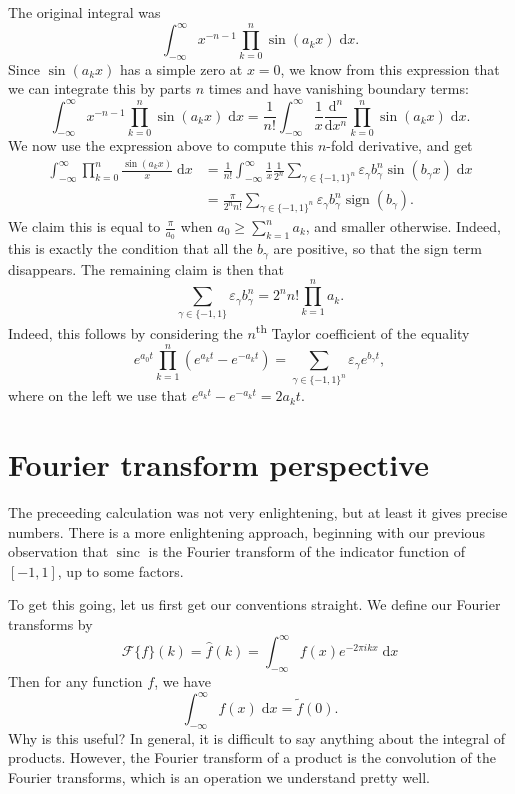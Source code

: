 \documentclass{shortart}
\theoremstyle{definition}
\DeclareMathOperator\sinc{sinc}
\DeclareMathOperator\sign{sign}
\renewcommand\d{\mathrm{d}}
\begin{document}
The original integral was
\[
  \int_{-\infty}^\infty x^{-n - 1} \prod_{k = 0}^n \sin(a_k x)\;\d x.
\]
Since $\sin(a_k x)$ has a simple zero at $x = 0$, we know from this expression that we can integrate this by parts $n$ times and have vanishing boundary terms:
\[
  \int_{-\infty}^\infty x^{-n - 1} \prod_{k = 0}^n \sin (a_k x)\;\d x = \frac{1}{n!} \int_{-\infty}^\infty \frac{1}{x} \frac{\d^n}{\d x^n} \prod_{k = 0}^n \sin (a_k x)\;\d x.
\]
We now use the expression above to compute this $n$-fold derivative, and get
\[
  \begin{aligned}
    \int_{-\infty}^\infty \prod_{k = 0}^n \frac{\sin(a_k x)}{x} \;\d x &= \frac{1}{n!}\int_{-\infty}^\infty \frac{1}{x} \frac{1}{2^n} \sum_{\gamma \in \{-1, 1\}^n} \varepsilon_\gamma b_\gamma^n \sin (b_\gamma x) \;\d x \\
    &= \frac{\pi}{2^n n!} \sum_{\gamma \in \{-1, 1\}^n} \varepsilon_\gamma b_\gamma^n \sign (b_\gamma).
  \end{aligned}
\]
We claim this is equal to $\frac{\pi}{a_0}$ when $a_0 \geq \sum_{k = 1}^n a_k$, and smaller otherwise. Indeed, this is exactly the condition that all the $b_\gamma$ are positive, so that the sign term disappears. The remaining claim is then that
\[
  \sum_{\gamma \in \{-1, 1\}} \varepsilon_\gamma b_\gamma^n = 2^n n! \prod_{k = 1}^n a_k.
\]
Indeed, this follows by considering the $n$\textsuperscript{th} Taylor coefficient of the equality
\[
  e^{a_0 t} \prod_{k = 1}^n (e^{a_k t} - e^{- a_k t}) = \sum_{\gamma \in \{-1, 1\}^n} \varepsilon_\gamma e^{b_\gamma t},
\]
where on the left we use that $e^{a_k t} - e^{-a_k t} = 2 a_k t$.

\section{Fourier transform perspective}
The preceeding calculation was not very enlightening, but at least it gives precise numbers. There is a more enlightening approach, beginning with our previous observation that $\sinc$ is the Fourier transform of the indicator function of $[-1, 1]$, up to some factors.

To get this going, let us first get our conventions straight. We define our Fourier transforms by
\[
  \mathcal{F}\{f\}(k) = \hat{f}(k) = \int_{-\infty}^\infty f(x) e^{-2\pi ikx}\;\d x
\]
Then for any function $f$, we have
\[
  \int_{-\infty}^\infty f(x) \;\d x = \tilde{f}(0).
\]
Why is this useful? In general, it is difficult to say anything about the integral of products. However, the Fourier transform of a product is the convolution of the Fourier transforms, which is an operation we understand pretty well.
\end{document}
